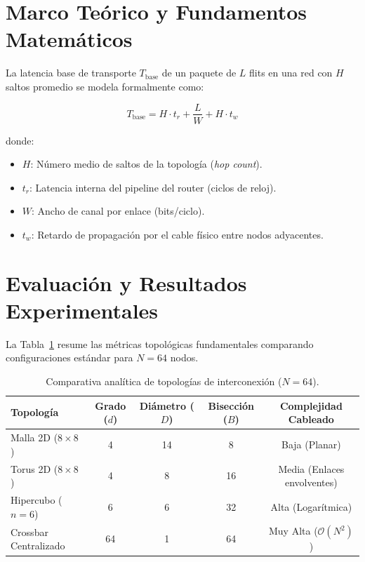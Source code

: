 \section{Marco Teórico y Fundamentos Matemáticos}
La latencia base de transporte $T_{\text{base}}$ de un paquete de $L$ flits en una red con $H$ saltos promedio se modela formalmente como:

\begin{equation}
    T_{\text{base}} = H \cdot t_r + \frac{L}{W} + H \cdot t_w
\end{equation}

\noindent donde:
\begin{itemize}
    \item $H$: Número medio de saltos de la topología (\textit{hop count}).
    \item $t_r$: Latencia interna del pipeline del router (ciclos de reloj).
    \item $W$: Ancho de canal por enlace (bits/ciclo).
    \item $t_w$: Retardo de propagación por el cable físico entre nodos adyacentes.
\end{itemize}

\section{Evaluación y Resultados Experimentales}
La Tabla~\ref{tab:topologias} resume las métricas topológicas fundamentales comparando configuraciones estándar para $N = 64$ nodos.

\begin{table}[htbp]
\centering
\caption{Comparativa analítica de topologías de interconexión ($N=64$).}
\label{tab:topologias}
\begin{tabularx}{\textwidth}{Xcccc}
\toprule
\textbf{Topología} & \textbf{Grado ($d$)} & \textbf{Diámetro ($D$)} & \textbf{Bisección ($B$)} & \textbf{Complejidad Cableado} \\
\midrule
Malla 2D ($8 \times 8$) & 4 & 14 & 8 & Baja (Planar) \\
Torus 2D ($8 \times 8$) & 4 & 8  & 16 & Media (Enlaces envolventes) \\
Hipercubo ($n=6$)      & 6 & 6  & 32 & Alta (Logarítmica) \\
Crossbar Centralizado   & 64 & 1 & 64 & Muy Alta ($\mathcal{O}(N^2)$) \\
\bottomrule
\end{tabularx}
\end{table}

